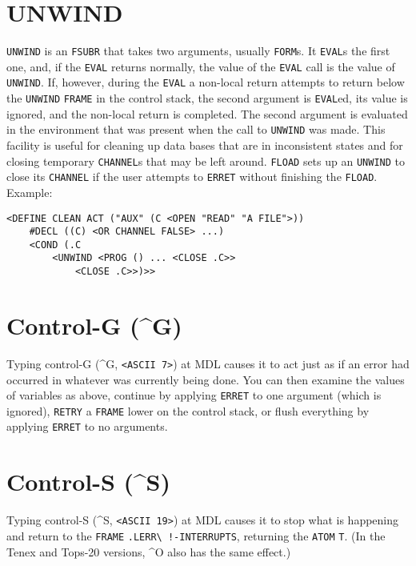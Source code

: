 \documentclass[a4paper]{scrbook}
\begin{document}
\section{UNWIND}\label{unwind}

 \texttt{UNWIND} is an \texttt{FSUBR} that takes two arguments, usually
\texttt{FORM}s. It \texttt{EVAL}s the first one, and, if the \texttt{EVAL} returns normally, the value of the \texttt{EVAL}
call is the value of \texttt{UNWIND}. If, however, during the \texttt{EVAL} a non-local return attempts to return below the
\texttt{UNWIND} \texttt{FRAME} in the control stack, the second argument is \texttt{EVAL}ed, its value is ignored, and the
non-local return is completed. The second argument is evaluated in the environment that was present when the call to
\texttt{UNWIND} was made. This facility is useful for cleaning up data bases that are in inconsistent states and for
closing temporary \texttt{CHANNEL}s that may be left around. \texttt{FLOAD} sets up an
\texttt{UNWIND} to close its \texttt{CHANNEL} if the user attempts to \texttt{ERRET} without finishing the \texttt{FLOAD}.
Example:

\begin{verbatim}
<DEFINE CLEAN ACT ("AUX" (C <OPEN "READ" "A FILE">))
    #DECL ((C) <OR CHANNEL FALSE> ...)
    <COND (.C
        <UNWIND <PROG () ... <CLOSE .C>>
            <CLOSE .C>>)>>
\end{verbatim}

\section{Control-G (\^{}G)}\label{control-g-g}

 Typing control-G (\^{}G, \texttt{\textless{}ASCII\ 7\textgreater{}}) at MDL causes it to act
just as if an error had occurred in whatever was currently being done. You can then examine the values of variables as
above, continue by applying \texttt{ERRET} to one argument (which is ignored), \texttt{RETRY} a \texttt{FRAME} lower on the
control stack, or flush everything by applying \texttt{ERRET} to no arguments.

\section{Control-S (\^{}S)}\label{control-s-s}

 Typing control-S (\^{}S, \texttt{\textless{}ASCII\ 19\textgreater{}}) at MDL causes it to
stop what is happening and return to the \texttt{FRAME}
\texttt{.LERR\textbackslash{}\ !-INTERRUPTS}, returning the \texttt{ATOM} \texttt{T}.
(In the Tenex and Tops-20 versions, \^{}O also
has the same effect.)
\end{document}
